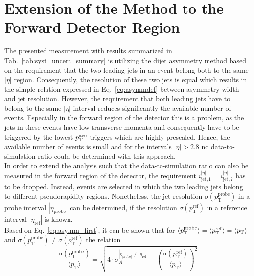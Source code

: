 \section{Extension of the Method to the Forward Detector Region}
\label{sec:jer_forward_extension}
The presented measurement with results summarized in Tab.~\ref{tab:syst_uncert_summary} is utilizing the dijet asymmetry method based on the requirement that the two leading jets in an event belong both to the same $|\eta|$ region. Consequently, the resolution of these two jets is equal which results in the simple relation expressed in Eq.~\ref{eq:asymmdef} between asymmetry width and jet resolution. However, the requirement that both leading jets have to belong to the same $|\eta|$ interval reduces significantly the available number of events. Especially in the forward region of the detector this is a problem, as the jets in these events have low transverse momenta and consequently have to be triggered by the lowest $p_{\text{T}}^\mathrm{ave}$ triggers which are highly prescaled. Hence, the available number of events is small and for the intervals $|\eta| > 2.8$ no data-to-simulation ratio could be determined with this approach. \\
In order to extend the analysis such that the data-to-simulation ratio can also be measured in the forward region of the detector, the requirement $i^{|\eta|}_{\mathrm{jet},1} = i^{|\eta|}_{\mathrm{jet},2}$ has to be dropped. Instead, events are selected in which the two leading jets belong to different pseudorapidity regions. Nonetheless, the jet resolution $\sigma (p_\mathrm{T}^{\mathrm{probe}})$ in a probe interval $|\eta_\mathrm{probe}|$ can be determined, if the resolution $\sigma (p_\mathrm{T}^{\mathrm{ref}})$ in a reference interval $|\eta_\mathrm{ref}|$ is known. \\
Based on Eq.~\ref{eq:asymm_first}, it can be shown that for $\langle p^\mathrm{probe}_\mathrm{T} \rangle = \langle p^\mathrm{ref}_\mathrm{T} \rangle = \langle p_{\text{T}} \rangle$ and $\sigma (p_\mathrm{T}^{\mathrm{probe}}) \neq \sigma (p_\mathrm{T}^{\mathrm{ref}})$ the relation
\begin{equation}
 \label{eq:asymm_forward}
  \frac{\sigma (p^\mathrm{probe}_\mathrm{T})}{\langle p_\mathrm{T} \rangle} = \sqrt{4 \cdot \sigma^{|\eta_{\mathrm{probe}|} \neq |\eta_{\mathrm{ref}}|}_{A} - \left(\frac{\sigma (p^\mathrm{ref}_\mathrm{T})}{\langle p_\mathrm{T} \rangle} \right)^2} 
 \end{equation}
